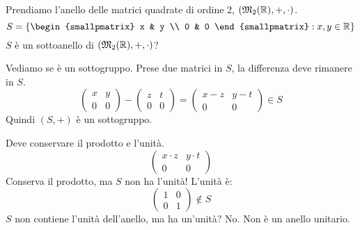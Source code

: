 \begin{exmp}
Prendiamo l'anello delle matrici quadrate di ordine 2, $(\mathfrak{M}_2 (\mathbb{R}), +, \cdot)$.
\[
S = \left\{ 
\begin{smallpmatrix}
x & y \\
0 & 0
\end{smallpmatrix}
 : x, y \in \reals \right\}
\]
$S$ \`e un sottoanello di $(\mathfrak{M}_2 (\mathbb{R}), +, \cdot)$?

Vediamo se \`e un sottogruppo. Prese due matrici in $S$, la differenza deve rimanere in $S$.
\[
\begin{pmatrix}
x & y \\
0 & 0
\end{pmatrix}
-
\begin{pmatrix}
z & t \\
0 & 0
\end{pmatrix}
=
\begin{pmatrix}
x - z & y - t \\
0 & 0
\end{pmatrix}
\in S
\]
Quindi $(S,+)$ \`e un sottogruppo.

Deve conservare il prodotto e l'unit\`a.
\[
\begin{pmatrix}
x \cdot z & y \cdot t \\
0 & 0
\end{pmatrix}
\]
Conserva il prodotto, ma $S$ non ha l'unit\`a! L'unit\`a \`e:
\[
\begin{pmatrix}
1 & 0 \\
0 & 1
\end{pmatrix}
\notin S
\]
$S$ non contiene l'unit\`a dell'anello, ma ha un'unit\`a? No. Non \`e un anello unitario.


\end{exmp}
